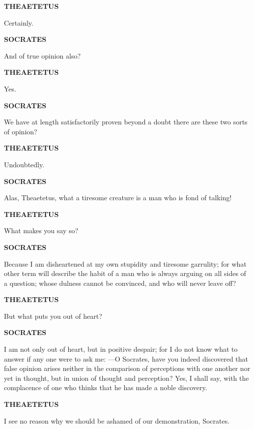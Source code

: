 \documentclass[11pt,letter]{article}
\begin{document}
\par \textbf{THEAETETUS}
\par   Certainly.

\par \textbf{SOCRATES}
\par   And of true opinion also?

\par \textbf{THEAETETUS}
\par   Yes.

\par \textbf{SOCRATES}
\par   We have at length satisfactorily proven beyond a doubt there are these two sorts of opinion?

\par \textbf{THEAETETUS}
\par   Undoubtedly.

\par \textbf{SOCRATES}
\par   Alas, Theaetetus, what a tiresome creature is a man who is fond of talking!

\par \textbf{THEAETETUS}
\par   What makes you say so?

\par \textbf{SOCRATES}
\par   Because I am disheartened at my own stupidity and tiresome garrulity; for what other term will describe the habit of a man who is always arguing on all sides of a question; whose dulness cannot be convinced, and who will never leave off?

\par \textbf{THEAETETUS}
\par   But what puts you out of heart?

\par \textbf{SOCRATES}
\par   I am not only out of heart, but in positive despair; for I do not know what to answer if any one were to ask me: —O Socrates, have you indeed discovered that false opinion arises neither in the comparison of perceptions with one another nor yet in thought, but in union of thought and perception? Yes, I shall say, with the complacence of one who thinks that he has made a noble discovery.

\par \textbf{THEAETETUS}
\par   I see no reason why we should be ashamed of our demonstration, Socrates.
\end{document}
